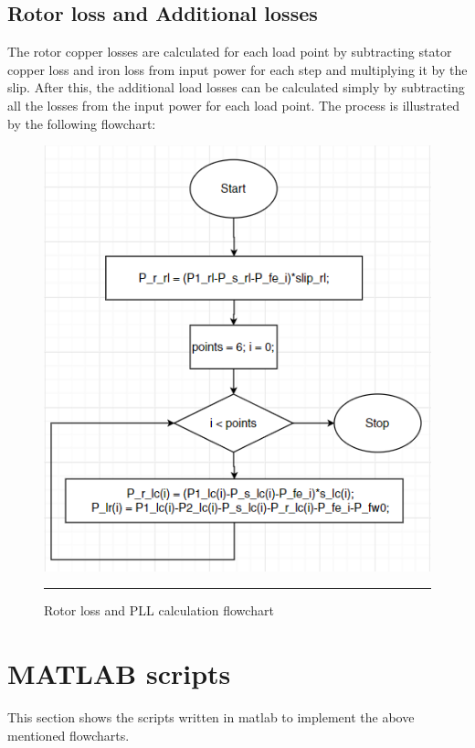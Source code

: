 \newpage
\subsection{Rotor loss and Additional losses}
The rotor copper losses are calculated for each load point by subtracting stator copper loss and iron loss from input power for each step and multiplying it by the slip. After this, the additional load losses can be calculated simply by subtracting all the losses from the input power for each load point. The process is illustrated by the following flowchart:
\begin{figure}[htbp]
	\centering
		\includegraphics[width = 4.5in]{./Figures/MS/fig45.png}
		\rule{35em}{0.5pt}
	\caption{Rotor loss and PLL calculation flowchart}
	\label{fig:Rotor loss and PLL calculation flowchart} 
\end{figure}

\section{MATLAB scripts}
This section shows the scripts written in matlab to implement the above mentioned flowcharts.

